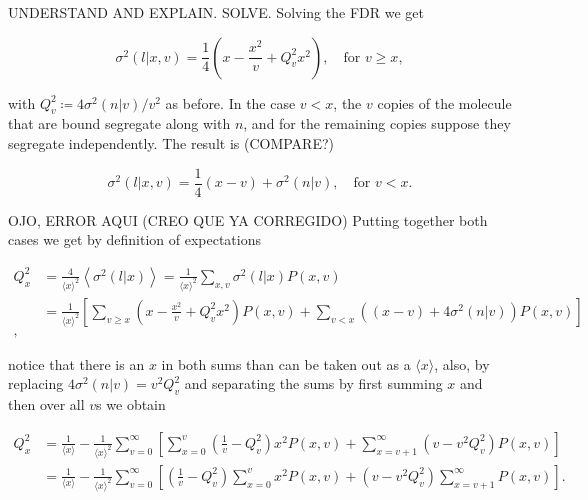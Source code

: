 UNDERSTAND AND EXPLAIN. SOLVE. Solving the FDR we get

\begin{equation}
  \sigma^2(l|x,v) =\frac{1}{4}\left(x-\frac{x^2}{v}+Q_v^2x^2\right),\quad \text{for } v\geq x,
\end{equation}

with $Q_v^2 \coloneqq 4\sigma^2(n|v)/v^2$ as before. In the case $v<x$, the $v$ copies of the molecule that are bound segregate along with $n$, and for the remaining copies suppose they segregate independently. The result is (COMPARE?)

\begin{equation}
  \sigma^2(l|x,v) = \frac{1}{4}(x-v) + \sigma^2(n|v),\quad \text{for } v<x.
\end{equation}

OJO, ERROR AQUI (CREO QUE YA CORREGIDO)
Putting together both cases we get by definition of expectations

\begin{equation*}
  \begin{split}
    Q_x^2 &= \frac{4}{\langle x\rangle^2}\left\langle\sigma^2(l|x)\right\rangle = \frac{1}{\langle x\rangle^2}\sum_{x,v}\sigma^2(l|x)P(x,v)\\
    &=\frac{1}{\langle x\rangle^2}\left[\sum_{v\geq x}\left(x-\frac{x^2}{v}+Q_v^2x^2\right)P(x,v) + \sum_{v<x}\left((x-v)+4\sigma^2(n|v)\right)P(x,v)\right]\\,
  \end{split}
\end{equation*}

notice that there is an $x$ in both sums than can be taken out as a $\langle x\rangle$, also, by replacing $4\sigma^2(n|v) = v^2Q_v^2$ and separating the sums by first summing $x$ and then over all $v$s we obtain

\begin{equation}
  \begin{split}
     Q_x^2 &= \frac{1}{\langle x\rangle} - \frac{1}{\langle x\rangle^2}\sum_{v=0}^\infty\left[\sum_{x=0}^v\left(\frac{1}{v}-Q_v^2\right)x^2P(x,v)+\sum_{x=v+1}^\infty\left(v-v^2Q_v^2\right)P(x,v)\right]\\
     &=\frac{1}{\langle x\rangle} - \frac{1}{\langle x\rangle^2}\sum_{v=0}^\infty\left[\left(\frac{1}{v}-Q_v^2\right)\sum_{x=0}^vx^2P(x,v)+\left(v-v^2Q_v^2\right)\sum_{x=v+1}^\infty P(x,v)\right].
  \end{split}
\end{equation}

